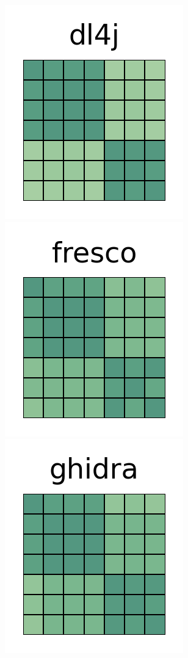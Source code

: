\documentclass[10pt,conference]{IEEEtran}
\begin{document}
\begin{figure}[htb!]
 \includegraphics[width=\heatmapWidth, keepaspectratio]{correlations-classic/deeplearning4j-grids.png}
 \includegraphics[width=\heatmapWidth, keepaspectratio]{correlations-classic/fresco-grids.png} \\
 \includegraphics[width=\heatmapWidth, keepaspectratio]{correlations-classic/ghidra-grids.png}

\end{figure}
\end{document}

